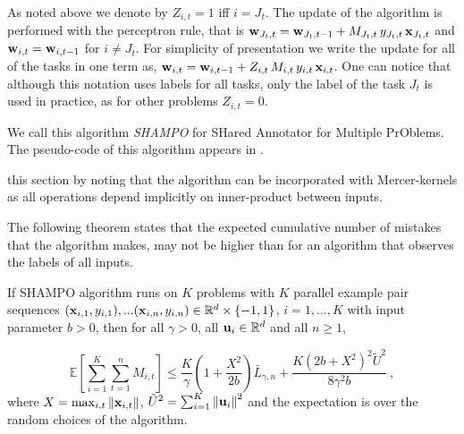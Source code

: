 As noted above we denote by $Z_{i,t}=1$ iff $i=J_t$.
The update of the algorithm is performed with the perceptron rule,
that is $\mathbf{w}_{J_t,t} = \mathbf{w}_{J_t,t-1}+M_{J_t,t} \, y_{J_t,t}\,
\mathbf{x}_{J_t,t}$ and $\mathbf{w}_{i,t} = \mathbf{w}_{i,t-1}$ for $i \neq J_t$. 
For simplicity of presentation we write the update for all of the tasks in one term  as, $\mathbf{w}_{i,t} =
\mathbf{w}_{i,t-1} + Z_{i,t}\, M_{i,t} \, y_{i,t}\, \mathbf{x}_{i,t}$. One can notice that although
this notation uses labels for all tasks,  %
 only
the label of the task $J_t$ is used in practice, as for other problems $Z_{i,t}=0$.



We call this algorithm {\em SHAMPO} for SHared Annotator for Multiple PrOblems. The pseudo-code of this algorithm appears  in .




this section by noting that the algorithm can be incorporated with
Mercer-kernels as all operations depend implicitly on inner-product
between inputs.

The following theorem states that the expected cumulative number of mistakes
that the algorithm makes, may not be higher than for an algorithm that
observes the labels of all inputs. 
\begin{theorem}
  If SHAMPO algorithm runs on $K$ problems with $K$ parallel example pair
  sequences
  $(\mathbf{x}_{i,1},y_{i,1}),...(\mathbf{x}_{i,n},y_{i,n})\in\mathbb{R}^d\times\{-1,1\}$,
  $i=1,...,K$ with input parameter $b>0$, then for all $\gamma>0$, all
  $\mathbf{u}_{i}\in\mathbb{R}^d$ and all $n\ge1$,
  
\begin{displaymath}
\mathbb{E}\left[ \sum_{i=1}^{K}\sum_{t=1}^{n}{M_{i,t}} \right]
\le \frac{K}{\gamma}\left(1+\frac{X^2}{2b} \right){\bar L}_{\gamma,n}
+\frac{K\left({2b+X^2}\right)^2\tilde{U}^2}{8{\gamma}^2b}~,
\label{bound_FO_SHAMPO}
\end{displaymath}
 where $X=\max_{i,t}\Vert\mathbf{x}_{i,t}\Vert$,
$\tilde{U}^2=\sum_{i=1}^{K}\left\Vert {\mathbf{u}_{i}} \right\Vert^2$ and the expectation is over the
random choices of the algorithm.
\end{theorem} \label{thm:FO_bound}

